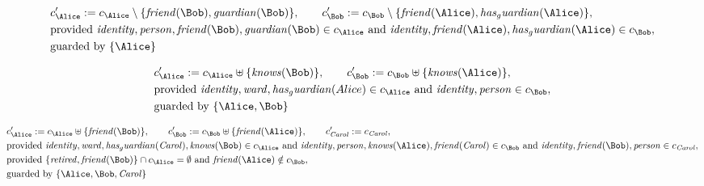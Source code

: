 \begin{align*}
&
c'_
{
\Alice
}
 := 
c_
{
\Alice
}
 \setminus 
\{
\mathit{
friend
}
(
\Bob
)
,
\mathit{
guardian
}
(
\Bob
)
\}
, \qquad 
c'_
{
\Bob
}
 := 
c_
{
\Bob
}
 \setminus 
\{
\mathit{
friend
}
(
\Alice
)
,
\mathit{
has_guardian
}
(
\Alice
)
\}
,\\
&
\text{provided } 
\mathit{
identity
}
,
\mathit{
person
}
,
\mathit{
friend
}
(
\Bob
)
,
\mathit{
guardian
}
(
\Bob
)
 \in c_
{
\Alice
}
 \text{ and } 
\mathit{
identity
}
,
\mathit{
friend
}
(
\Alice
)
,
\mathit{
has_guardian
}
(
\Alice
)
 \in c_
{
\Bob
}
,\\
&
\text{guarded by } \{
\Alice
\}
\end{align*}

\begin{align*}
&
c'_
{
\Alice
}
 := 
c_
{
\Alice
}
 \uplus 
\{
\mathit{
knows
}
(
\Bob
)
\}
, \qquad 
c'_
{
\Bob
}
 := 
c_
{
\Bob
}
 \uplus 
\{
\mathit{
knows
}
(
\Alice
)
\}
,\\
&
\text{provided } 
\mathit{
identity
}
,
\mathit{
ward
}
,
\mathit{
has_guardian
}
(
Alice
)
 \in c_
{
\Alice
}
 \text{ and } 
\mathit{
identity
}
,
\mathit{
person
}
 \in c_
{
\Bob
}
,\\
&
\text{guarded by } \{
\Alice
,
\Bob
\}
\end{align*}

\begin{align*}
&
c'_
{
\Alice
}
 := 
c_
{
\Alice
}
 \uplus 
\{
\mathit{
friend
}
(
\Bob
)
\}
, \qquad 
c'_
{
\Bob
}
 := 
c_
{
\Bob
}
 \uplus 
\{
\mathit{
friend
}
(
\Alice
)
\}
, \qquad 
c'_
{
\mathit{Carol}
}
 := 
c_
{
\mathit{Carol}
}
,\\
&
\text{provided } 
\mathit{
identity
}
,
\mathit{
ward
}
,
\mathit{
has_guardian
}
(
\mathit{Carol}
)
,
\mathit{
knows
}
(
\Bob
)
 \in c_
{
\Alice
}
 \text{ and } 
\mathit{
identity
}
,
\mathit{
person
}
,
\mathit{
knows
}
(
\Alice
)
,
\mathit{
friend
}
(
\mathit{Carol}
)
 \in c_
{
\Bob
}
 \text{ and } 
\mathit{
identity
}
,
\mathit{
friend
}
(
\Bob
)
,
\mathit{
person
}
 \in c_
{
\mathit{Carol}
}
,\\
&
\text{provided } 
\{
\mathit{
retired
}
,
\mathit{
friend
}
(
\Bob
)
\}
 \cap c_
{
\Alice
}
 = \emptyset
 \text{ and } 
\mathit{
friend
}
(
\Alice
)
 \notin c_
{
\Bob
}
,\\
&
\text{guarded by } \{
\Alice
,
\Bob
,
\mathit{Carol}
\}
\end{align*}

